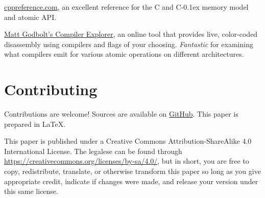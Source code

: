 \documentclass[fontsize=10pt, oneside]{scrartcl}
\newcommand{\cplusplus}[1]{C\kern-0.1ex\raisebox{0.15ex}{\texttt{++}}#1}
\newcommand{\clang}[1]{C#1}
\begin{document}
\href{https://en.cppreference.com}{cppreference.com},
an excellent reference for the \clang{} and \cplusplus{} memory model and atomic \textsc{API}.

\href{https://godbolt.org/}{Matt Godbolt's Compiler Explorer},
an online tool that provides live, color-coded disassembly using compilers and flags of your choosing.
\emph{Fantastic} for examining what compilers emit for various atomic operations on different architectures.

\section{Contributing}

Contributions are welcome!
Sources are available on
\href{https://github.com/sysprog21/concurrency-primer}{GitHub}.
This paper is prepared in \LaTeX{}.

This paper is published under a
Creative Commons Attribution-ShareAlike 4.0 International License.
The legalese can be found through
\url{https://creativecommons.org/licenses/by-sa/4.0/},
but in short,
you are free to copy, redistribute, translate, or otherwise transform this paper
so long as you give appropriate credit, indicate if changes were made,
and release your version under this same license.
\end{document}
